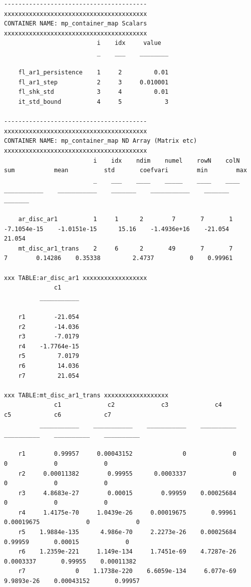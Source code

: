 \documentclass[
]{book}
\begin{document}
\begin{verbatim}
----------------------------------------
xxxxxxxxxxxxxxxxxxxxxxxxxxxxxxxxxxxxxxxx
CONTAINER NAME: mp_container_map Scalars
xxxxxxxxxxxxxxxxxxxxxxxxxxxxxxxxxxxxxxxx
                          i    idx     value  
                          _    ___    ________

    fl_ar1_persistence    1     2         0.01
    fl_ar1_step           2     3     0.010001
    fl_shk_std            3     4         0.01
    it_std_bound          4     5            3

----------------------------------------
xxxxxxxxxxxxxxxxxxxxxxxxxxxxxxxxxxxxxxxx
CONTAINER NAME: mp_container_map ND Array (Matrix etc)
xxxxxxxxxxxxxxxxxxxxxxxxxxxxxxxxxxxxxxxx
                         i    idx    ndim    numel    rowN    colN        sum           mean          std       coefvari        min        max  
                         _    ___    ____    _____    ____    ____    ___________    ___________    _______    ___________    _______    _______

    ar_disc_ar1          1     1      2        7       7       1      -7.1054e-15    -1.0151e-15      15.16    -1.4936e+16    -21.054     21.054
    mt_disc_ar1_trans    2     6      2       49       7       7                7        0.14286    0.35338         2.4737          0    0.99961

xxx TABLE:ar_disc_ar1 xxxxxxxxxxxxxxxxxx
              c1     
          ___________

    r1        -21.054
    r2        -14.036
    r3        -7.0179
    r4    -1.7764e-15
    r5         7.0179
    r6         14.036
    r7         21.054

xxx TABLE:mt_disc_ar1_trans xxxxxxxxxxxxxxxxxx
              c1             c2             c3             c4            c5            c6            c7    
          ___________    ___________    ___________    __________    __________    __________    __________

    r1        0.99957     0.00043152              0             0             0             0             0
    r2     0.00011382        0.99955      0.0003337             0             0             0             0
    r3     4.8683e-27        0.00015        0.99959    0.00025684             0             0             0
    r4     1.4175e-70     1.0439e-26     0.00019675       0.99961    0.00019675             0             0
    r5    1.9884e-135      4.986e-70     2.2273e-26    0.00025684       0.99959       0.00015             0
    r6    1.2359e-221     1.149e-134     1.7451e-69    4.7287e-26     0.0003337       0.99955    0.00011382
    r7              0    1.1738e-220    6.6059e-134     6.077e-69    9.9893e-26    0.00043152       0.99957


\end{verbatim}
\end{document}
